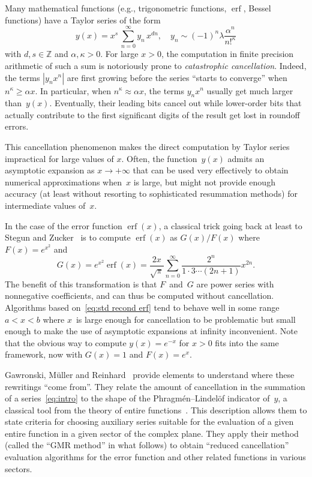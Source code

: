 \documentclass[10pt, conference]{IEEEtran}
\DeclareMathOperator{\erf}{erf}
\newcommand{\Z}{\mathbb{Z}}
\begin{document}
Many mathematical functions (e.g., trigonometric functions, $\erf$, Bessel functions) have a Taylor series of the form
\begin{equation}
  y(x) = x^s\,\sum_{n = 0}^{\infty} y_n\,x^{dn}, \hspace{1em} y_n \sim (-1)^n \lambda \frac{\alpha^n}{n!^{\kappa}}
  \label{eq:intro}
\end{equation}
with $d, s \in \Z$ and $\alpha, \kappa > 0$.
For large $x > 0$, the computation in finite precision arithmetic of such a sum
is notoriously prone to {\emph{catastrophic cancellation}}.
Indeed, the terms $|y_n x^n|$ are first growing before the series ``starts to
converge'' when $n^{\kappa} \ge \alpha x$. In particular, when $n^{\kappa} \approx \alpha x$,
the terms $y_n x^n$ usually get much larger than~$y(x)$. Eventually, their leading
bits cancel out while lower-order bits that actually contribute to the first
significant digits of the result get lost in roundoff errors.

This cancellation phenomenon makes the direct
computation by Taylor series impractical for large values of $x$.
Often, the function~$y(x)$ admits an asymptotic expansion as
{$x \rightarrow + \infty$}
that can be used very effectively to obtain numerical approximations when~$x$
is large, but might not provide enough accuracy (at least without resorting to sophisticated resummation methods) for intermediate values of~$x$.

In the case of the error function $\operatorname{erf}(x)$, a
classical trick going back at least to Stegun and
Zucker~{\cite{StegunZucker1970}} is to compute $\operatorname{erf}(x)$
as $G(x) / F(x)$ where $F(x) =
e^{x^2}$ and~{\cite[Eq.~7.6.2]{DLMF}}
\begin{equation}
  G(x) = e^{x^2} \operatorname{erf}(x) = \frac{2
  x}{\sqrt{\pi}}  \sum_{n = 0}^{\infty} \frac{2^n}{1 \cdot 3 \cdots(2
  n + 1)} x^{2 n} . \label{eq:std recond erf}
\end{equation}
The benefit of this transformation is that $F$~and~$G$ are power series with
nonnegative coefficients, and can thus be computed without cancellation.
Algorithms based on~\eqref{eq:std recond erf} tend to behave well in some
range $a < x < b$ where $x$~is large enough for cancellation to be problematic
but small enough to make the use of asymptotic expansions at infinity
inconvenient.
Note that the obvious way to compute $y(x) = e^{-
x}$ for $x > 0$ fits into the same framework, now with $G(x) = 1$
and $F(x) = e^x$.

Gawronski, M\"uller and
Reinhard~{\cite{GawronskiMullerReinhard2007,Reinhard2008}} provide elements to
understand where these rewritings ``come from''. They relate the amount of
cancellation in the summation of a series~\eqref{eq:intro} to the shape of the
Phragm\'en--Lindel\"of indicator of~$y$, a classical tool from the theory of
entire functions~{\cite{Levin1996}}. This description allows them to state
criteria for choosing auxiliary series suitable for the evaluation of a given
entire function in a given sector of the complex plane. They apply their
method (called the ``GMR method'' in what follows) to obtain ``reduced
cancellation'' evaluation algorithms for the error function and other related
functions in various sectors.
\end{document}
